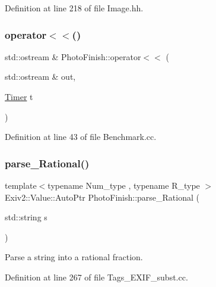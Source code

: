 Definition at line 218 of file Image.\+hh.

\mbox{\label{namespace_photo_finish_a3044516746909ba15410d161d15ee1c5}} 
\subsubsection{\texorpdfstring{operator$<$$<$()}{operator<<()}}
{\footnotesize\ttfamily std\+::ostream \& Photo\+Finish\+::operator$<$$<$ (\begin{DoxyParamCaption}\item[{std\+::ostream \&}]{out,  }\item[{\hyperlink{class_photo_finish_1_1_timer}{Timer}}]{t }\end{DoxyParamCaption})}



Definition at line 43 of file Benchmark.\+cc.

\mbox{\label{namespace_photo_finish_a61d5056e25d8cc76ff69e9a2e3782c76}} 
\subsubsection{\texorpdfstring{parse\+\_\+\+Rational()}{parse\_Rational()}}
{\footnotesize\ttfamily template$<$typename Num\+\_\+type , typename R\+\_\+type $>$ \\
Exiv2\+::\+Value\+::\+Auto\+Ptr Photo\+Finish\+::parse\+\_\+\+Rational (\begin{DoxyParamCaption}\item[{std\+::string}]{s }\end{DoxyParamCaption})}



Parse a string into a rational fraction. 



Definition at line 267 of file Tags\+\_\+\+E\+X\+I\+F\+\_\+subst.\+cc.

\mbox{\label{namespace_photo_finish_a3ccb46c945cf009874ba8dbc24d15ac6}} 

